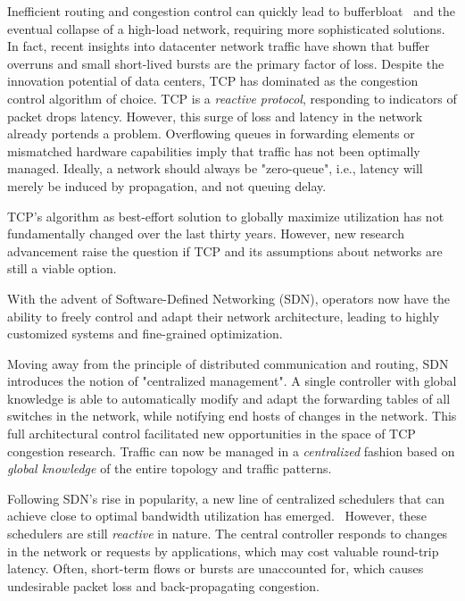 Inefficient routing and congestion control can quickly lead to 
bufferbloat~\cite{bufferbloat} and the eventual collapse of a high-load 
network, requiring more sophisticated solutions. In fact, recent insights into 
datacenter network traffic have shown that buffer overruns and small 
short-lived bursts are the primary factor of loss.\cite{fb_dc,msr_dc,dctcp}
Despite the innovation potential of data centers, TCP has dominated as 
the congestion control algorithm of choice.
TCP is a \textit{reactive protocol}, responding to indicators of packet drops
latency. However, this surge of loss and latency in the network already 
portends a problem. Overflowing queues in forwarding elements or mismatched 
hardware capabilities imply that traffic has not been optimally managed.
Ideally, a network should always be "zero-queue", i.e., latency 
will merely be induced by propagation, and not queuing delay.

TCP's algorithm as best-effort solution to globally maximize utilization has 
not fundamentally changed over the last thirty years. However, new research 
advancement raise the question if TCP and its assumptions about networks are 
still a viable option.~\cite{pcc,bbr,perc}

With the advent of Software-Defined Networking (SDN), operators now have the 
ability to freely control and adapt their network architecture, leading to 
highly customized systems and fine-grained optimization.~\cite{sdn_road}

Moving away from the principle of distributed communication and routing, SDN 
introduces the notion of "centralized management". A single controller with 
global knowledge is able to automatically modify and adapt the forwarding 
tables of all switches in the network, while notifying end hosts of changes in 
the network.
This full architectural control facilitated new opportunities in the space of 
TCP congestion research. Traffic can now be managed in a  \textit{centralized} 
fashion based on \textit{global knowledge} of the entire topology and traffic 
patterns.

Following SDN's rise in popularity, a new line of centralized schedulers that 
can achieve close to optimal bandwidth utilization has emerged.~\cite{hedera, 
fastpass, microte, b4, dionysus}
However, these schedulers are still \textit{reactive} in nature. The central 
controller responds to changes in the network or requests by applications, 
which may cost valuable round-trip latency. Often, short-term flows or bursts 
are unaccounted for, which causes undesirable packet loss and back-propagating 
congestion.~\cite{perc}

